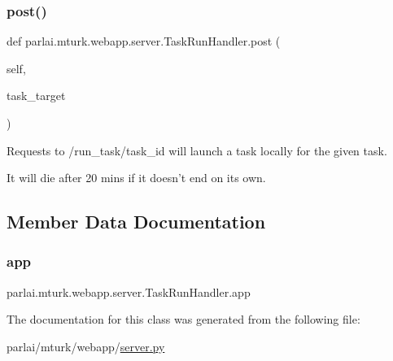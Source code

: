 \mbox{\label{classparlai_1_1mturk_1_1webapp_1_1server_1_1TaskRunHandler_a957a29eb2fcfec6fba5890470387e1d0}} 
\subsubsection{\texorpdfstring{post()}{post()}}
{\footnotesize\ttfamily def parlai.\+mturk.\+webapp.\+server.\+Task\+Run\+Handler.\+post (\begin{DoxyParamCaption}\item[{}]{self,  }\item[{}]{task\+\_\+target }\end{DoxyParamCaption})}

\begin{DoxyVerb}Requests to /run_task/{task_id} will launch a task locally for the given task.

It will die after 20 mins if it doesn't end on its own.
\end{DoxyVerb}
 

\subsection{Member Data Documentation}
\mbox{\label{classparlai_1_1mturk_1_1webapp_1_1server_1_1TaskRunHandler_ae9e57d3ffed2fe707e9b1b041e65c2b7}} 
\subsubsection{\texorpdfstring{app}{app}}
{\footnotesize\ttfamily parlai.\+mturk.\+webapp.\+server.\+Task\+Run\+Handler.\+app}



The documentation for this class was generated from the following file\+:\begin{DoxyCompactItemize}
\item 
parlai/mturk/webapp/\hyperlink{server_8py}{server.\+py}\end{DoxyCompactItemize}
